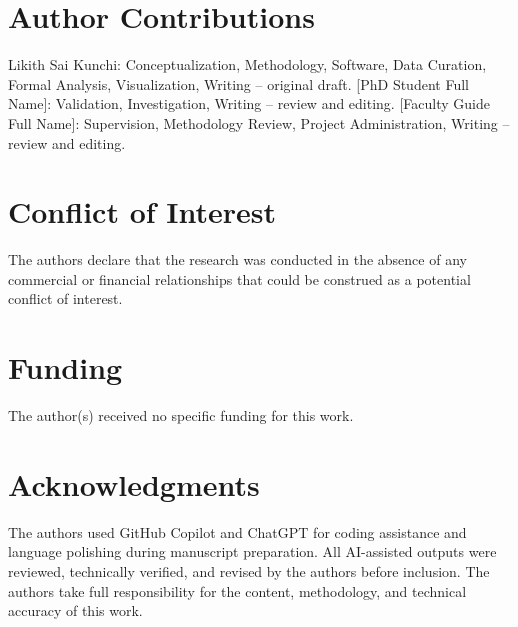 \documentclass[utf8]{FrontiersinHarvard}
\begin{document}
\section*{Author Contributions}
Likith Sai Kunchi: Conceptualization, Methodology, Software, Data Curation, Formal Analysis, Visualization, Writing -- original draft. [PhD Student Full Name]: Validation, Investigation, Writing -- review and editing. [Faculty Guide Full Name]: Supervision, Methodology Review, Project Administration, Writing -- review and editing.

\section*{Conflict of Interest}
The authors declare that the research was conducted in the absence of any commercial or financial relationships that could be construed as a potential conflict of interest.

\section*{Funding}
The author(s) received no specific funding for this work.

\section*{Acknowledgments}
The authors used GitHub Copilot and ChatGPT for coding assistance and language polishing during manuscript preparation. All AI-assisted outputs were reviewed, technically verified, and revised by the authors before inclusion. The authors take full responsibility for the content, methodology, and technical accuracy of this work.



\end{document}
